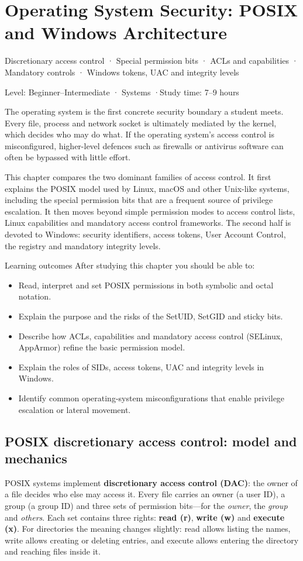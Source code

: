 \documentclass[11pt,openany]{book}
\newcommand{\chaptermeta}[3]{%
  {\sffamily\small\color{accent}#1\par}\vspace{0.3em}
  {\sffamily\footnotesize\color{gray}#2 \quad·\quad #3\par}\vspace{1.2em}}
\begin{document}
\chapter{Operating System Security: POSIX and Windows Architecture}\label{ch:2}
\chaptermeta{Discretionary access control · Special permission bits · ACLs and capabilities · Mandatory controls · Windows tokens, UAC and integrity levels}{Level: Beginner–Intermediate · Systems}{Study time: 7–9 hours}

The operating system is the first concrete security boundary a student meets. Every file, process and network socket is ultimately mediated by the kernel, which decides who may do what. If the operating system's access control is misconfigured, higher-level defences such as firewalls or antivirus software can often be bypassed with little effort.

This chapter compares the two dominant families of access control. It first explains the POSIX model used by Linux, macOS and other Unix-like systems, including the special permission bits that are a frequent source of privilege escalation. It then moves beyond simple permission modes to access control lists, Linux capabilities and mandatory access control frameworks. The second half is devoted to Windows: security identifiers, access tokens, User Account Control, the registry and mandatory integrity levels.

\begin{outcomesbox}{Learning outcomes}
After studying this chapter you should be able to:
\begin{itemize}
  \item Read, interpret and set POSIX permissions in both symbolic and octal notation.
  \item Explain the purpose and the risks of the SetUID, SetGID and sticky bits.
  \item Describe how ACLs, capabilities and mandatory access control (SELinux, AppArmor) refine the basic permission model.
  \item Explain the roles of SIDs, access tokens, UAC and integrity levels in Windows.
  \item Identify common operating-system misconfigurations that enable privilege escalation or lateral movement.
\end{itemize}
\end{outcomesbox}

\section{POSIX discretionary access control: model and mechanics}\label{sec:2.1}
POSIX systems implement \textbf{discretionary access control (DAC)}: the owner of a file decides who else may access it. Every file carries an owner (a user ID), a group (a group ID) and three sets of permission bits—for the \emph{owner}, the \emph{group} and \emph{others}. Each set contains three rights: \textbf{read (r)}, \textbf{write (w)} and \textbf{execute (x)}. For directories the meaning changes slightly: read allows listing the names, write allows creating or deleting entries, and execute allows entering the directory and reaching files inside it.
\end{document}
